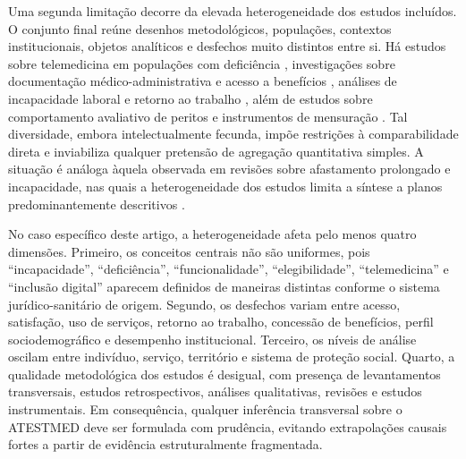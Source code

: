 \documentclass[12pt,a4paper]{article}
\begin{document}
Uma segunda limitação decorre da elevada heterogeneidade dos estudos incluídos. O conjunto final reúne desenhos metodológicos, populações, contextos institucionais, objetos analíticos e desfechos muito distintos entre si. Há estudos sobre telemedicina em populações com deficiência \parencite{albasheer2026telemedicineutilizationanddigitalinclusionamongpe,ftouni2022challengesoftelemedicineduringthecovid19pandemica}, investigações sobre documentação médico-administrativa e acesso a benefícios \parencite{rajasulochana2026doeshavingadisabilitycertificateensurebenefit,sa2020medicalcertificateofdisabilityadescriptiveanalysisofav,nogueira20200731t0100000100aavaliacaodadeficiencianatraje}, análises de incapacidade laboral e retorno ao trabalho \parencite{gabbay2011niceguidanceonlongtermsicknessandincapacity,sainsbury2006routesontoincapacitybenefitsfindingsfromqualitati,corden2001incapacitybenefitsandworkincentives,przysada2019anassessmentofworkabilityafterthecompletionofre}, além de estudos sobre comportamento avaliativo de peritos e instrumentos de mensuração \parencite{steenbeek2011thedevelopmentofinstrumentstomeasuretheworkdisa,dijkstrasdatamakingupincapacityforwork}. Tal diversidade, embora intelectualmente fecunda, impõe restrições à comparabilidade direta e inviabiliza qualquer pretensão de agregação quantitativa simples. A situação é análoga àquela observada em revisões sobre afastamento prolongado e incapacidade, nas quais a heterogeneidade dos estudos limita a síntese a planos predominantemente descritivos \parencite{gabbay2011niceguidanceonlongtermsicknessandincapacity}.

No caso específico deste artigo, a heterogeneidade afeta pelo menos quatro dimensões. Primeiro, os conceitos centrais não são uniformes, pois “incapacidade”, “deficiência”, “funcionalidade”, “elegibilidade”, “telemedicina” e “inclusão digital” aparecem definidos de maneiras distintas conforme o sistema jurídico-sanitário de origem. Segundo, os desfechos variam entre acesso, satisfação, uso de serviços, retorno ao trabalho, concessão de benefícios, perfil sociodemográfico e desempenho institucional. Terceiro, os níveis de análise oscilam entre indivíduo, serviço, território e sistema de proteção social. Quarto, a qualidade metodológica dos estudos é desigual, com presença de levantamentos transversais, estudos retrospectivos, análises qualitativas, revisões e estudos instrumentais. Em consequência, qualquer inferência transversal sobre o ATESTMED deve ser formulada com prudência, evitando extrapolações causais fortes a partir de evidência estruturalmente fragmentada.
\end{document}
